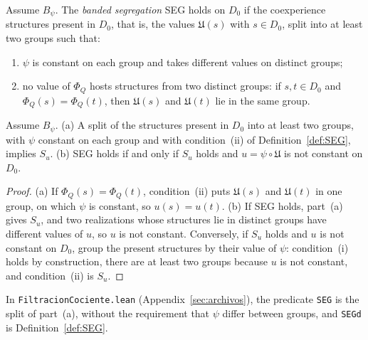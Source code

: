 \begin{definition}[SEG]\label{def:SEG}
Assume $B_\psi$. The \emph{banded segregation} SEG holds on $D_0$ if the coexperience structures present in $D_0$, that is, the values $\mathfrak U(s)$ with $s\in D_0$, split into at least two groups such that:
\begin{enumerate}
\item[(i)] $\psi$ is constant on each group and takes different values on distinct groups;
\item[(ii)] no value of $\Phi_Q$ hosts structures from two distinct groups: if $s,t\in D_0$ and $\Phi_Q(s)=\Phi_Q(t)$, then $\mathfrak U(s)$ and $\mathfrak U(t)$ lie in the same group.
\end{enumerate}
\end{definition}

\begin{proposition}\label{prop:seg}
Assume $B_\psi$. \textup{(a)} A split of the structures present in $D_0$ into at least two groups, with $\psi$ constant on each group and with condition~(ii) of Definition~\ref{def:SEG}, implies $S_u$. \textup{(b)} SEG holds if and only if $S_u$ holds and $u=\psi\circ\mathfrak U$ is not constant on $D_0$. \stL
\end{proposition}
\begin{proof}
(a) If $\Phi_Q(s)=\Phi_Q(t)$, condition~(ii) puts $\mathfrak U(s)$ and $\mathfrak U(t)$ in one group, on which $\psi$ is constant, so $u(s)=u(t)$. (b) If SEG holds, part~(a) gives $S_u$, and two realizations whose structures lie in distinct groups have different values of $u$, so $u$ is not constant. Conversely, if $S_u$ holds and $u$ is not constant on $D_0$, group the present structures by their value of $\psi$: condition~(i) holds by construction, there are at least two groups because $u$ is not constant, and condition~(ii) is $S_u$.
\end{proof}
In \texttt{FiltracionCociente.lean} (Appendix~\ref{sec:archivos}), the predicate \texttt{SEG} is the split of part~(a), without the requirement that $\psi$ differ between groups, and \texttt{SEGd} is Definition~\ref{def:SEG}.

